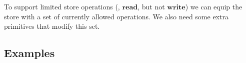 To support limited store operations ({\eg}, \ensuremath{\textbf{read}},
but not \ensuremath{\textbf{write}}) we can equip the store with a set of currently allowed operations.
We also need some extra primitives that modify this set.

\subsection{Examples}

